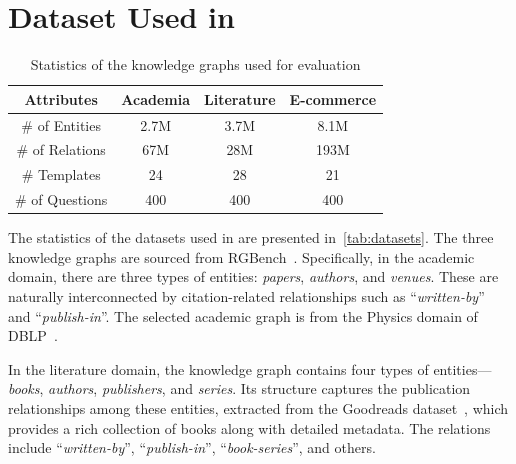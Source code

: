 \section{Dataset Used in \benchmarkname}\label{sec:dataset_appendix}

\begin{table}[ht]
\centering
\caption{Statistics of the knowledge graphs used for evaluation}
\label{tab:datasets}
\begin{tabular}{@{}cccc@{}}
\toprule
\textbf{Attributes}     & \textbf{Academia} & \textbf{Literature} & \textbf{E-commerce} \\ \midrule
\# of Entities       & 2.7M             & 3.7M               & 8.1M            \\
\# of Relations      & 67M              & 28M                & 193M            \\
\# Templates      & 24              & 28                & 21  \\
\# of Questions      & 400              & 400                & 400  \\ \bottomrule
\end{tabular}%
\end{table}

The statistics of the datasets used in \benchmarkname{} are presented in~\autoref{tab:datasets}. The three knowledge graphs are sourced from RGBench~\cite{graphcot}. Specifically, in the academic domain, there are three types of entities: \textit{papers}, \textit{authors}, and \textit{venues}. These are naturally interconnected by citation-related relationships such as ``\textit{written-by}'' and ``\textit{publish-in}''. The selected academic graph is from the Physics domain of DBLP~\cite{academia}. 

In the literature domain, the knowledge graph contains four types of entities—\textit{books}, \textit{authors}, \textit{publishers}, and \textit{series}. Its structure captures the publication relationships among these entities, extracted from the Goodreads dataset~\cite{literature}, which provides a rich collection of books along with detailed metadata. The relations include ``\textit{written-by}'', ``\textit{publish-in}'', ``\textit{book-series}'', and others.

